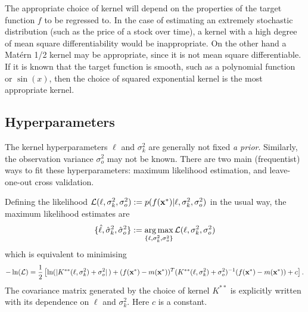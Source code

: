 The appropriate choice of kernel will depend on the properties of the
target function $f$ to be regressed to. In the case of estimating an extremely
stochastic distribution (such as the price of a stock over time), a
kernel with a high degree of mean square differentiability would be
inappropriate. On the other hand a Mat\'ern 1/2 kernel may be appropriate,
since it is not mean square differentiable. If it is known that the target
function is smooth, such as a polynomial function or $\sin(x)$,
then the choice of squared
exponential kernel is the most appropriate kernel.

\subsection*{Hyperparameters}

The kernel hyperparameters $\ell$ and $\sigma^2_k$ are generally not fixed
\emph{a prior}. Similarly, the observation variance $\sigma^2_o$
may not be known.
There are two main (frequentist) ways to fit these hyperparameters:
maximum likelihood estimation, and leave-one-out cross validation.

Defining the likelihood
$
    \mathcal{L}(\ell, \sigma^2_k, \sigma^2_o)
    := p(f(\mathbf{x}^\ast) | \ell, \sigma^2_k, \sigma^2_o)
$ in the usual way,
the maximum likelihood estimates are
\begin{align}
        \{\hat{\ell}, \hat{\sigma}^2_k, \hat{\sigma}^2_o\} :=
        \operatorname*{arg\,max}_{\{\ell, \sigma^2_k, \sigma^2_o\}}
        \mathcal{L}(\ell, \sigma^2_k, \sigma^2_o)
        \label{eq:MLE_GP}
\end{align}
which is equivalent to minimising
$$
    -\ln(\mathcal{L}) =\frac{1}{2} \left[
    \ln (|K^{**}(\ell, \sigma^2_k) + \sigma^2_o|\,)
    + (f(\mathbf{x}^\ast) - m(\mathbf{x}^\ast))^T
    (K^{**}(\ell, \sigma^2_k) + \sigma^2_o)^{-1}
    (f(\mathbf{x}^\ast) - m(\mathbf{x}^\ast)) + c
    \right].
$$
The covariance matrix generated by the choice of kernel $K^{**}$ is
explicitly written with its dependence on $\ell$ and $\sigma^2_k.$ Here $c$ is a
constant.

